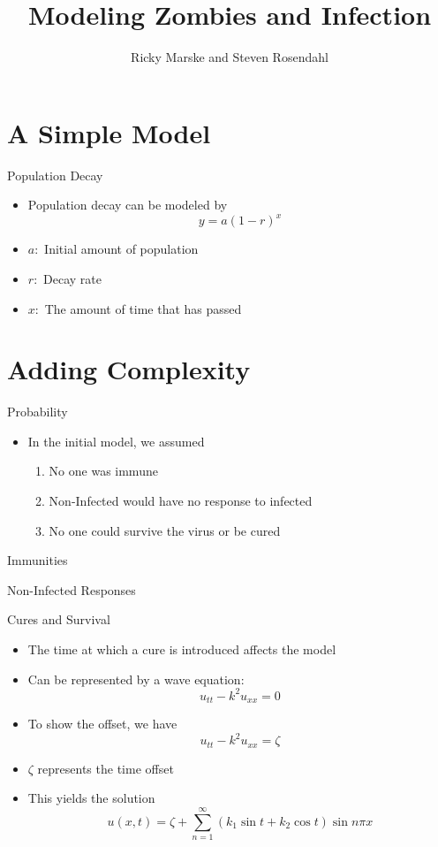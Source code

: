 \documentclass{beamer}
\title{Modeling Zombies and Infection}
\author{Ricky Marske and Steven Rosendahl}
\date{}
\begin{document}
\frame{\titlepage}

\section{A Simple Model}

\begin{frame}{Population Decay}
\begin{itemize}
\item Population decay can be modeled by
\[y=a(1-r)^{x}\]
\pause
\item $a:$ Initial amount of population
\pause
\item $r:$ Decay rate
\pause
\item $x:$ The amount of time that has passed
\end{itemize}
\end{frame}

\section{Adding Complexity}

\begin{frame}{Probability}
\begin{itemize}
\item In the initial model, we assumed
\pause
\begin{enumerate}
\item No one was immune
\pause
\item Non-Infected would have no response to infected
\pause
\item No one could survive the virus or be cured
\end{enumerate}
\end{itemize}
\end{frame}

\begin{frame}{Immunities}

\end{frame}

\begin{frame}{Non-Infected Responses}

\end{frame}

\begin{frame}{Cures and Survival}
\begin{itemize}
\item The time at which a cure is introduced affects the model
\pause
\item Can be represented by a wave equation:
\[
u_{tt}-k^{2}u_{xx}=0
\]
\pause
\item To show the offset, we have
\[
u_{tt}-k^{2}u_{xx}=\zeta
\]
\pause
\item $\zeta$ represents the time offset
\pause
\item This yields the solution
\[
u(x,t)=\zeta+\sum_{n=1}^{\infty}(k_{1}\sin{t}+k_{2}\cos{t})\sin{n\pi x}
\]
\end{itemize}
\end{frame}
\end{document}
